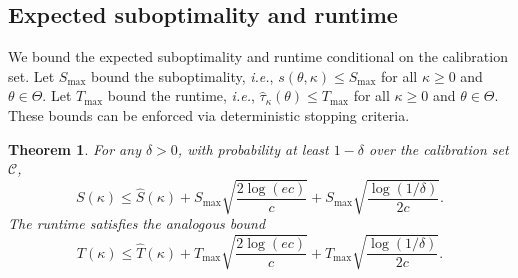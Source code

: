 \documentclass[12pt]{article}
\newtheorem{theorem}{Theorem}[section]     %
\newtheorem{lemma}[theorem]{Lemma}         %
\theoremstyle{definition}
\theoremstyle{remark}
\newcommand{\paramspace}{\Theta}
\newcommand{\param}{\theta}
\newcommand{\reals}{\mathbf{R}}
\newcommand{\pst}{\hat{\tau}}
\newcommand{\calibration}{\mathcal{C}}
\newcommand{\ie}{\emph{i.e.}}
\newcommand{\termov}{s}
\newcommand{\lt}{\kappa}
\newcommand{\zbd}{{S_{\text{max}}}}
\newcommand{\ncalib}{c}
\newcommand{\runtime}{T}
\newcommand{\tbd}{T_{\max}}
\newcommand{\paramspace}{\Theta}
\newcommand{\param}{\theta}
\newcommand{\reals}{\mathbf{R}}
\newcommand{\pst}{\hat{\tau}}
\newcommand{\calibration}{\mathcal{C}}
\newcommand{\ie}{\emph{i.e.}}
\newcommand{\termov}{s}
\newcommand{\lt}{\kappa}
\newcommand{\zbd}{{S_{\text{max}}}}
\newcommand{\ncalib}{c}
\newcommand{\runtime}{T}
\newcommand{\tbd}{T_{\max}}
\theoremstyle{plain}
\newtheorem{theorem}{Theorem}[section]
\newtheorem{lemma}[theorem]{Lemma}
\theoremstyle{definition}
\theoremstyle{remark}
\begin{document}
\subsection{Expected suboptimality and runtime} \label{sec:expected}
We bound the expected suboptimality and runtime conditional on the calibration set.
Let $\zbd$ bound the suboptimality, \ie, $\termov(\param, \lt) \le \zbd$ for all $\lt \ge 0$ and $\param \in \paramspace$.
Let $\tbd$ bound the runtime, \ie, $\pst_\lt(\param) \le \tbd$ for all $\lt \ge 0$ and $\param \in \paramspace$.
These bounds can be enforced via deterministic stopping criteria.
\begin{theorem} \label{thm:expect}
    For any $\delta > 0$, with probability at least $1 - \delta$ over the calibration set $\calibration$,
    \begin{equation*}
        S(\lt) \le \hat{S}(\lt) + \zbd \sqrt{\frac{2\log (e \ncalib)}{\ncalib}} + \zbd \sqrt{\frac{\log(1/\delta)}{2\ncalib}}.
    \end{equation*}
    The runtime satisfies the analogous bound
    \begin{equation*}
        \runtime(\lt) \le \hat{\runtime}(\lt) + \tbd \sqrt{\frac{2\log (e \ncalib)}{\ncalib}} + \tbd \sqrt{\frac{\log(1/\delta)}{2\ncalib}}.
    \end{equation*}
\end{theorem}
\end{document}
